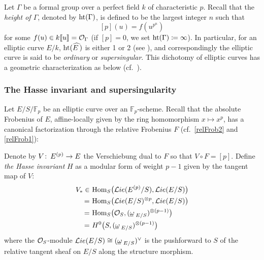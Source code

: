 \documentclass{gtpart}
\theoremstyle{definition}
\theoremstyle{remark}
\def\co{\colon\thinspace}
\newcommand{\mb}[1]{\mathbb{#1}}
\newcommand{\Hom}{\ensuremath{{\rm Hom}}}
\newcommand{\CLie}{{\cal L}ie}
\newcommand{\CO}{{\cal O}}
\newcommand{\BF}{{\mb F}}
\newcommand{\HE}{\widehat{E~}\!}
\newcommand{\HT}{{\rm ht}}
\newcommand{\G}{\Gamma}
\newcommand{\om}{\underline{\omega\!}_{~E/S}}
\newcommand{\ce}{\coloneqq}
\numberwithin{equation}{section}
\numberwithin{thm}{section}
\begin{document}
Let $\G$ be a formal group over a perfect field $k$ of characteristic 
$p$.  Recall that the {\em height of $\G$}, denoted by $\HT(\G)$, is 
defined to be the largest integer $n$ such that 
\[
 [p](u) = f(u^{p^n}) 
\]
for some $f(u) \in k \llbracket u \rrbracket = \CO_\G$ (if $[p] = 0$, we 
set $\HT(\G) \ce \infty$).  In particular, for an elliptic curve $E/k$, 
$\HT(\HE)$ is either 1 or 2 (see \cite[IV.7.5]{AEC}), and 
correspondingly the elliptic curve is said to be {\em ordinary} or 
{\em supersingular}.  This dichotomy of elliptic curves has a geometric 
characterization as below (cf.~\cite[12.4.1]{KM}).  

\subsubsection*{The Hasse invariant and supersingularity}

Let $E/S/\BF_p$ be an elliptic curve over an $\BF_p$-scheme.  Recall 
that the absolute Frobenius of $E$, affine-locally given by the ring 
homomorphism $x \mapsto x^p$, has a canonical factorization through the 
relative Frobenius $F$ (cf.~\eqref{relFrob2} and \eqref{relFrob1}): 
\begin{center}
\end{center}
Denote by $V \co E^{(p)} \to E$ the Verschiebung dual to $F$ so that 
$V \circ F = [p]$.  Define {\em the Hasse invariant} $H$ as a modular 
form of weight $p-1$ given by the tangent map of $V$: 
\begin{equation*}
\begin{split}
 V_* \in & ~ \Hom_S \big( \CLie(E^{(p)}/S), \CLie(E/S) \big) \\
       = & ~ \Hom_S \big( \CLie(E/S)^{\otimes p}, \CLie(E/S) \big) \\
       = & ~ \Hom_S \big( \CO_S, (\om)^{\otimes (p-1)} \big) \\
       = & ~ H^0 \big( S, (\om)^{\otimes (p-1)} \big) 
\end{split}
\end{equation*}
where the $\CO_S$-module $\CLie(E/S) \cong (\om)^\vee$ is the 
pushforward to $S$ of the relative tangent sheaf on $E/S$ along the 
structure morphism.  
\end{document}
